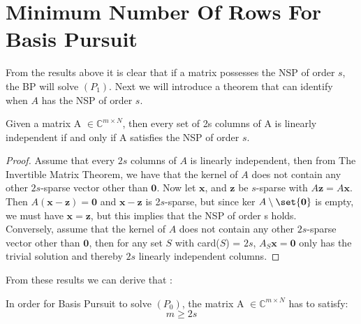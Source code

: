 \section*{Minimum Number Of Rows For Basis Pursuit}

From the results above it is clear that if a matrix possesses the NSP of order $s$, the BP will solve $(P_1)$. Next we will introduce a theorem that can identify when $A$ has the NSP of order $s$.  


\begin{tcolorbox}[colback=yellow,colframe=white]
\begin{theorem}
Given a matrix A $\in \mathbb{C}^{m \times N}$, then every set of 2s columns of A is linearly independent if and only if A satisfies the NSP of order $s$. 
\end{theorem}
\end{tcolorbox}



\begin{proof}
Assume that every $2s$ columns of $A$ is linearly independent, then from The Invertible Matrix Theorem, we have that the kernel of $A$ does not contain any other $2s$-sparse vector other than $\mathbf{0}$. Now let $\mathbf{x}$, and $\mathbf{z}$ be $s$-sparse with $A\mathbf{z} = A\mathbf{x}$. Then $A(\mathbf{x}-\mathbf{z}) = \mathbf{0}$ and $\mathbf{x}-\mathbf{z}$ is 2$s$-sparse, but since ker $A \setminus \set{\mathbf{0}}$ is empty, we must have $\mathbf{x}=\mathbf{z}$, but this implies that the NSP of order s holds.
\\ Conversely, assume that the kernel of $A$ does not contain any other $2s$-sparse vector other than $\mathbf{0}$, then for any set $S$ with card($S$) = $2s$, $A_{S}\mathbf{x} = \mathbf{0}$ only has the trivial solution and thereby $2s$ linearly independent columns. 
\end{proof}

From these results we can derive that : 


\begin{tcolorbox}[colback=green,colframe=white]
\begin{corollary}
In order for Basis Pursuit to solve $(P_{0})$, the matrix A $\in \mathbb{C}^{m \times N}$ has to satisfy: 
\begin{equation*}
m \geq 2s
\end{equation*}
\end{corollary}
\end{tcolorbox}

